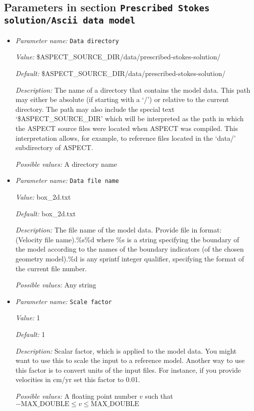 \subsection{Parameters in section \tt Prescribed Stokes solution/Ascii data model}
\label{parameters:Prescribed_20Stokes_20solution/Ascii_20data_20model}

\begin{itemize}
\item {\it Parameter name:} {\tt Data directory}
\label{parameters:Prescribed Stokes solution/Ascii data model/Data directory}


{\it Value:} \$ASPECT\_SOURCE\_DIR/data/prescribed-stokes-solution/


{\it Default:} \$ASPECT\_SOURCE\_DIR/data/prescribed-stokes-solution/


{\it Description:} The name of a directory that contains the model data. This path may either be absolute (if starting with a `/') or relative to the current directory. The path may also include the special text `\$ASPECT\_SOURCE\_DIR' which will be interpreted as the path in which the ASPECT source files were located when ASPECT was compiled. This interpretation allows, for example, to reference files located in the `data/' subdirectory of ASPECT. 


{\it Possible values:} A directory name
\item {\it Parameter name:} {\tt Data file name}
\label{parameters:Prescribed Stokes solution/Ascii data model/Data file name}


{\it Value:} box\_2d.txt


{\it Default:} box\_2d.txt


{\it Description:} The file name of the model data. Provide file in format: (Velocity file name).\%s\%d where \%s is a string specifying the boundary of the model according to the names of the boundary indicators (of the chosen geometry model).\%d is any sprintf integer qualifier, specifying the format of the current file number. 


{\it Possible values:} Any string
\item {\it Parameter name:} {\tt Scale factor}
\label{parameters:Prescribed Stokes solution/Ascii data model/Scale factor}


{\it Value:} 1


{\it Default:} 1


{\it Description:} Scalar factor, which is applied to the model data. You might want to use this to scale the input to a reference model. Another way to use this factor is to convert units of the input files. For instance, if you provide velocities in cm/yr set this factor to 0.01.


{\it Possible values:} A floating point number $v$ such that $-\text{MAX\_DOUBLE} \leq v \leq \text{MAX\_DOUBLE}$
\end{itemize}

